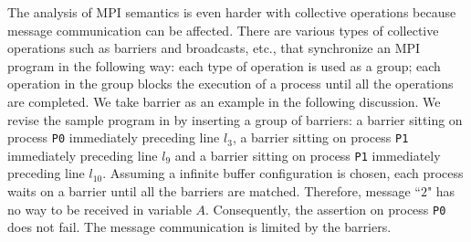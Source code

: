 
The analysis of MPI semantics is even harder with collective operations because message communication can be affected. There are various types of collective operations such as barriers and broadcasts, etc., that synchronize an MPI program in the following way: each type of operation is used as a group; each operation in the group blocks the execution of a process until all the operations are completed. We take barrier as an example in the following discussion. We revise the sample program in  by inserting a group of barriers: a barrier sitting on process \texttt{P0} immediately preceding line $l_3$, a barrier sitting on process \texttt{P1} immediately preceding line $l_9$ and a barrier sitting on process \texttt{P1} immediately preceding line $l_{10}$. Assuming a infinite buffer configuration is chosen, each process waits on a barrier until all the barriers are matched. Therefore, message ``$2$" has no way to be received in variable $A$. Consequently, the assertion on process \texttt{P0} does not fail. The message communication is limited by the barriers. 






